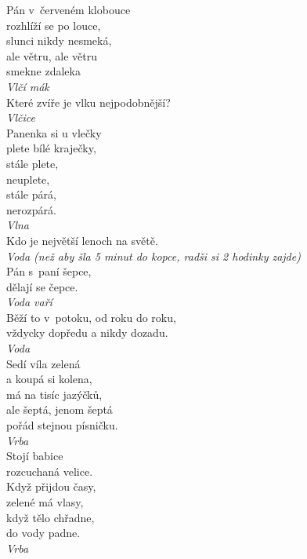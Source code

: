 \begin{multicols}{3}
\noindent
Pán v~červeném klobouce\\
rozhlíží se po louce,\\
slunci nikdy nesmeká,\\
ale větru, ale větru\\
smekne zdaleka\\[1 mm]
{\sl Vlčí mák}\\

\noindent
Které zvíře je vlku nejpodobnější?\\[1 mm]
{\sl Vlčice}\\

\noindent
Panenka si u vlečky\\
plete bílé kraječky,\\
stále plete,\\
neuplete,\\
stále párá,\\
nerozpárá.\\[1 mm]
{\sl Vlna}\\

\noindent
Kdo je největší lenoch na světě.\\[1 mm]
{\sl Voda (než aby šla 5 minut do kopce, radši si 2 hodinky zajde)}\\

\noindent
Pán s~paní šepce,\\
dělají se čepce.\\[1 mm]
{\sl Voda vaří}\\

\noindent
Běží to v~potoku, od roku do roku,\\
vždycky dopředu a nikdy dozadu.\\[1 mm]
{\sl Voda}\\

\noindent
Sedí víla zelená\\
a koupá si kolena,\\
má na tisíc jazýčků,\\
ale šeptá, jenom šeptá\\
pořád stejnou písničku.\\[1 mm]
{\sl Vrba}\\

\noindent
Stojí babice\\
rozcuchaná velice.\\
Když přijdou časy,\\
zelené má vlasy,\\
když tělo chřadne,\\
do vody padne.\\[1 mm]
{\sl Vrba}\\


\end{multicols}
